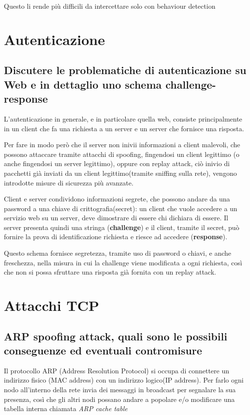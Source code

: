 \documentclass{report}
\begin{document}
\noindent Questo li rende più difficili da intercettare solo con behaviour detection




\chapter{Autenticazione}

\section{Discutere le problematiche di autenticazione su Web e in dettaglio uno schema challenge-response}
\noindent L'autenticazione in generale, e in particolare quella web, consiste principalmente in un client che fa una richiesta a un server e un server che fornisce una risposta.

\noindent Per fare in modo però che il server non inivii informazioni a client malevoli, che possono attaccare tramite attacchi di spoofing,
fingendosi un client legittimo (o anche fingendosi un server legittimo), oppure con replay attack, ciò inivio di pacchetti già inviati da un client legittimo(tramite 
sniffing sulla rete), vengono introdotte misure di sicurezza più avanzate.

\noindent Client e server condividono informazioni segrete, che possono andare da una password a una chiave di crittografia(secret):
un client che vuole accedere a un servizio web su un server, deve dimostrare di essere chi dichiara di essere. Il server presenta quindi 
una stringa (\textbf{challenge}) e il client, tramite il secret, può fornire la prova di identificazione richiesta e riesce ad accedere (\textbf{response}).

\noindent Questo schema fornisce segretezza, tramite uso di password o chiavi, e anche freschezza, nella misura in cui la challenge viene modificata a ogni richiesta, così
che non si possa sfruttare una risposta già fornita con un replay attack.


\chapter{Attacchi TCP}

\section{ARP spoofing attack, quali sono le possibili conseguenze ed eventuali contromisure}
\noindent Il protocollo ARP (Address Resolution Protocol) si occupa di connettere un indirizzo fisico (MAC address) con un indirizzo logico(IP address). Per farlo ogni nodo all'interno della rete invia dei messaggi in broadcast
per segnalare la sua presenza, così che gli altri nodi possano andare a popolare e/o modificare una tabella interna chiamata \textit{ARP cache table}
\end{document}

